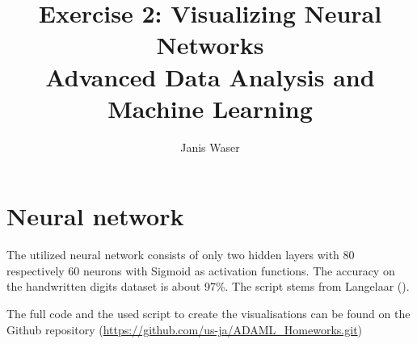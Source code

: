 \documentclass{article}
\begin{document}
\makeatletter
\newcommand{\linebreakand}{%
      \end{@IEEEauthorhalign}
      \hfill\mbox{}\par
      \mbox{}\hfill\begin{@IEEEauthorhalign}
    }
\makeatother

\title{ Exercise 2: Visualizing Neural Networks\\
Advanced Data Analysis and Machine Learning }

\author{
Janis Waser
}
\maketitle

%

\section{Neural network}
The utilized neural network consists of only two hidden layers with 80 respectively 60 neurons with Sigmoid as activation functions. The accuracy on the handwritten digits dataset is about 97\%. The script stems from Langelaar (\cite{script}). 

The full code and the used script to create the visualisations can be found on the Github repository (\url{https://github.com/us-ja/ADAML_Homeworks.git}{})
\end{document}
